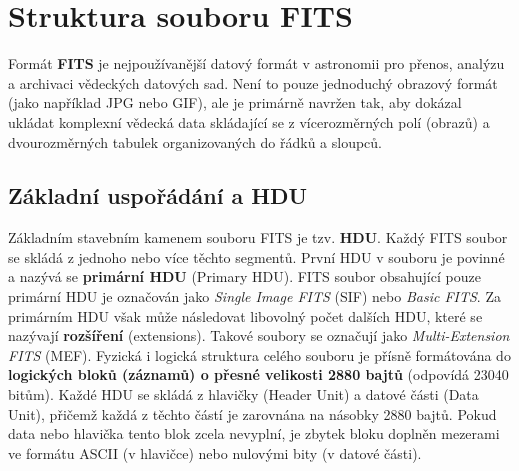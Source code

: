 \section{Struktura souboru FITS} \label{sec:fits_structure}
Formát \textbf{\ac{FITS}} je nejpoužívanější datový formát v astronomii pro přenos, analýzu a archivaci vědeckých datových sad. Není to pouze jednoduchý obrazový formát (jako například JPG nebo GIF), ale je primárně navržen tak, aby dokázal ukládat komplexní vědecká data skládající se z vícerozměrných polí (obrazů) a dvourozměrných tabulek organizovaných do řádků a sloupců. 
\subsection{Základní uspořádání a HDU} Základním stavebním kamenem souboru \ac{FITS} je tzv. \textbf{\ac{HDU}}. Každý \ac{FITS} soubor se skládá z jednoho nebo více těchto segmentů. První \ac{HDU} v souboru je povinné a nazývá se \textbf{primární HDU} (Primary HDU).
\ac{FITS} soubor obsahující pouze primární HDU je označován jako \textit{Single Image FITS} (SIF) nebo \textit{Basic FITS}. Za primárním \ac{HDU} však může následovat libovolný počet dalších \ac{HDU}, které se nazývají \textbf{rozšíření} (extensions). Takové soubory se označují jako \textit{Multi-Extension FITS} (MEF).
Fyzická i logická struktura celého souboru je přísně formátována do \textbf{logických bloků (záznamů) o přesné velikosti 2880 bajtů} (odpovídá 23040 bitům). Každé \ac{HDU} se skládá z hlavičky (Header Unit) a datové části (Data Unit), přičemž každá z těchto částí je zarovnána na násobky 2880 bajtů. Pokud data nebo hlavička tento blok zcela nevyplní, je zbytek bloku doplněn mezerami ve formátu ASCII (v hlavičce) nebo nulovými bity (v datové části).\cite{fits_standard}
